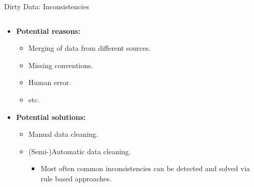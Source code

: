 \begin{frame}{Dirty Data: Inconsistencies}
	\begin{columns}
		\begin{column}{0.45\textwidth}
			\begin{itemize}
				\item \textbf{Potential reasons:}
				      \begin{itemize}
					      \item Merging of data from different sources.
					      \item Missing conventions.
					      \item Human error.
					      \item etc.
				      \end{itemize}
				\item \textbf{Potential solutions:}
				      \begin{itemize}
					      \item Manual data cleaning.
					      \item (Semi-)Automatic data cleaning.
					            \begin{itemize}
						            \item Most often common inconsistencies can be detected and solved via rule based approaches.
					            \end{itemize}
				      \end{itemize}
			\end{itemize}
		\end{column}

		\begin{column}{0.45\textwidth}
			\centering

			\vspace*{1cm}


		\end{column}

	\end{columns}
\end{frame}


